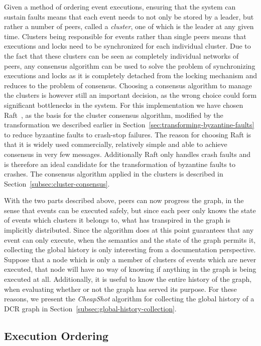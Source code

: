 \documentclass{article}
\begin{document}
	Given a method of ordering event executions, ensuring that the system can sustain faults means that each event needs to not only be stored by a leader, but rather a number of peers, called a \textit{cluster}, one of which is the leader at any given time.
	Clusters being responsible for events rather than single peers means that executions and locks need to be synchronized for each individual cluster.
	Due to the fact that these clusters can be seen as completely individual networks of peers, any consensus algorithm can be used to solve the problem of synchronizing executions and locks as it is completely detached from the locking mechanism and reduces to the problem of consensus.
	Choosing a consensus algorithm to manage the clusters is however still an important decision, as the wrong choice could form significant bottlenecks in the system.
	For this implementation we have chosen Raft~\cite{ongaro_search_2014}, as the basis for the cluster consensus algorithm, modified by the transformation we described earlier in Section~\ref{sec:transforming-byzantine-faults} to reduce byzantine faults to crash-stop failures.
	The reason for choosing Raft is that it is widely used commercially, relatively simple and able to achieve consensus in very few messages.
	Additionally Raft only handles crash faults and is therefore an ideal candidate for the transformation of byzantine faults to crashes.
	The consensus algorithm applied in the clusters is described in Section~\ref{subsec:cluster-consensus}.

	With the two parts described above, peers can now progress the graph, in the sense that events can be executed safely, but since each peer only knows the state of events which clusters it belongs to, what has transpired in the graph is implicitly distributed.
	Since the algorithm does at this point guarantees that any event can only execute, when the semantics and the state of the graph permits it, collecting the global history is only interesting from a documentation perspective.
	Suppose that a node which is only a member of clusters of events which are never executed, that node will have no way of knowing if anything in the graph is being executed at all.
	Additionally, it is useful to know the entire history of the graph, when evaluating whether or not the graph has served its purpose.
	For these reasons, we present the \textit{CheapShot} algorithm for collecting the global history of a DCR graph in Section~\ref{subsec:global-history-collection}.

	\subsection{Execution Ordering}
	\label{subsec:execution-ordering}
\end{document}
